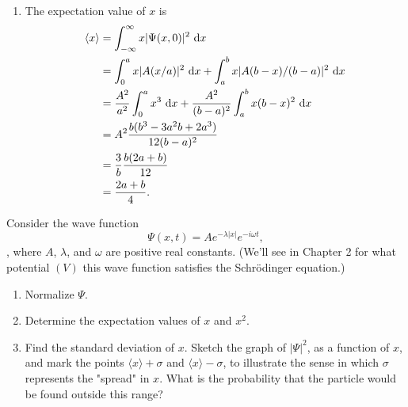 \documentclass[en, oneside]{vivi}
\begin{document}
\begin{sol}
\begin{enumerate}[label=(\alph*)]
        \item The expectation value of $x$ is
        \begin{align*}
            \langle x \rangle &= \int_{-\infty}^{\infty} x |\Psi (x, 0)|^2 \dif x\\
            &= \int_{0}^{a} x |A (x/a)|^2 \dif x + \int_{a}^{b} x |A (b - x)/(b - a)|^2 \dif x\\
            &= \frac{A^2}{a^2} \int_{0}^{a} x^3 \dif x + \frac{A^2}{(b - a)^2} \int_{a}^{b} x (b - x)^2 \dif x\\
            &= A^2 \frac{b(b^3 - 3 a^2 b + 2 a^3)}{12 (b - a)^2}\\
            &= \frac{3}{b} \frac{b(2a + b)}{12}\\
            &= \frac{2a + b}{4}.
        \end{align*}
    \end{enumerate}
\end{sol}

\begin{prob}
    Consider the wave function
    \begin{equation*}
        \Psi (x, t) = A e^{-\lambda |x|} e^{-i \omega t},
    \end{equation*},
    where $A$, $\lambda$, and $\omega$ are positive real constants. (We'll see in Chapter 2 for what potential $(V)$ this wave function satisfies the Schrödinger equation.)
    \begin{enumerate}[label=(\alph*)]
        \item Normalize $\Psi$.
        \item Determine the expectation values of $x$ and $x^2$.
        \item Find the standard deviation of $x$. Sketch the graph of $|\Psi|^2$, as a function of $x$, and mark the points $\langle x \rangle + \sigma$ and $\langle x \rangle - \sigma$, to illustrate the sense in which $\sigma$ represents the "spread" in $x$. What is the probability that the particle would be found outside this range?
    \end{enumerate}
\end{prob}
\end{document}
